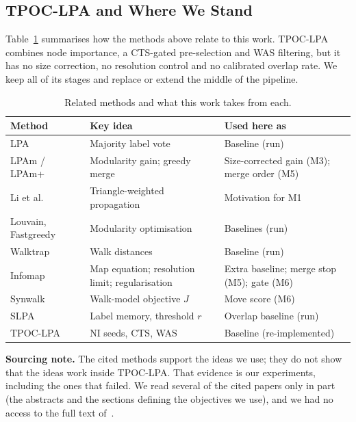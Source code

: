 \documentclass[conference]{IEEEtran}
\begin{document}
\subsection{TPOC-LPA and Where We Stand}
Table~\ref{tab:related} summarises how the methods above relate to this work. TPOC-LPA~\cite{kong2026} combines node importance, a CTS-gated pre-selection and WAS filtering, but it has no size correction, no resolution control and no calibrated overlap rate. We keep all of its stages and replace or extend the middle of the pipeline.
\begin{table}[t]
\centering
\caption{Related methods and what this work takes from each.}
\label{tab:related}
\scriptsize
\begin{tabular}{>{\raggedright\arraybackslash}p{19mm}>{\raggedright\arraybackslash}p{26mm}>{\raggedright\arraybackslash}p{29mm}}
\toprule
Method & Key idea & Used here as \\
\midrule
LPA~\cite{raghavan2007} & Majority label vote & Baseline (run) \\
LPAm / LPAm+~\cite{barber2009,liu2010} & Modularity gain; greedy merge & Size-corrected gain (M3); merge order (M5) \\
Li et al.~\cite{li2020motif} & Triangle-weighted propagation & Motivation for M1 \\
Louvain, Fastgreedy~\cite{blondel2008,clauset2004} & Modularity optimisation & Baselines (run) \\
Walktrap~\cite{pons2006} & Walk distances & Baseline (run) \\
Infomap~\cite{rosvall2008,kawamoto2015,smiljanic2020} & Map equation; resolution limit; regularisation & Extra baseline; merge stop (M5); gate (M6) \\
Synwalk~\cite{toth2022} & Walk-model objective $J$ & Move score (M6) \\
SLPA~\cite{xie2011} & Label memory, threshold $r$ & Overlap baseline (run) \\
TPOC-LPA~\cite{kong2026} & NI seeds, CTS, WAS & Baseline (re-implemented) \\
\bottomrule
\end{tabular}
\end{table}
\textbf{Sourcing note.} The cited methods support the ideas we use; they do not show that the ideas work inside TPOC-LPA. That evidence is our experiments, including the ones that failed. We read several of the cited papers only in part (the abstracts and the sections defining the objectives we use), and we had no access to the full text of~\cite{li2020motif}.
\end{document}
